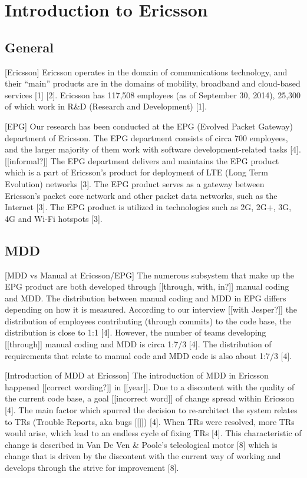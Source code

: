 \documentclass[final_report_innit.tex]{subfiles}
\begin{document}
\section{Introduction to Ericsson}

\subsection*{General}
[Ericsson]
Ericsson operates in the domain of communications technology, and their “main” products are in the domains of mobility, broadband and cloud-based services [1] [2]. Ericsson has 117,508 employees (as of September 30, 2014), 25,300 of which work in R\&D (Research and Development) [1].

[EPG]
Our research has been conducted at the EPG (Evolved Packet Gateway) department of Ericsson. The EPG department consists of circa 700 employees, and the larger majority of them work with software development-related tasks [4]. [[informal?]]  The EPG department delivers and maintains the EPG product which is a part of Ericsson’s product for deployment of LTE (Long Term Evolution) networks [3]. The EPG product serves as a gateway between Ericsson’s packet core network and other packet data networks, such as the Internet [3]. The EPG product is utilized in technologies such as 2G, 2G+, 3G, 4G and Wi-Fi hotspots [3].

\subsection*{MDD}

[MDD vs Manual at Ericsson/EPG]
The numerous subsystem that make up the EPG product are both developed through [[through, with, in?]] manual coding and MDD. The distribution between manual coding and MDD in EPG differs depending on how it is measured. According to our interview [[with Jesper?]] the distribution of employees contributing (through commits) to the code base, the distribution is close to 1:1 [4]. However, the number of teams developing [[through]] manual coding and MDD is circa 1:7/3 [4]. The distribution of requirements that relate to manual code and MDD code is also about 1:7/3 [4].

[Introduction of MDD at Ericsson]
The introduction of MDD in Ericsson happened [[correct wording?]] in [[year]]. Due to a discontent with the quality of the current code base, a goal [[incorrect word]] of change spread within Ericsson [4]. The main factor which spurred the decision to re-architect the system relates to TRs (Trouble Reports, aka bugs [[]]) [4]. When TRs were resolved, more TRs would arise, which lead to an endless cycle of fixing TRs [4]. This characteristic of change is described in Van De Ven \& Poole’s teleological motor [8] which is change that is driven by the discontent with the current way of working and develops through the strive for improvement [8]. 
\end{document}
